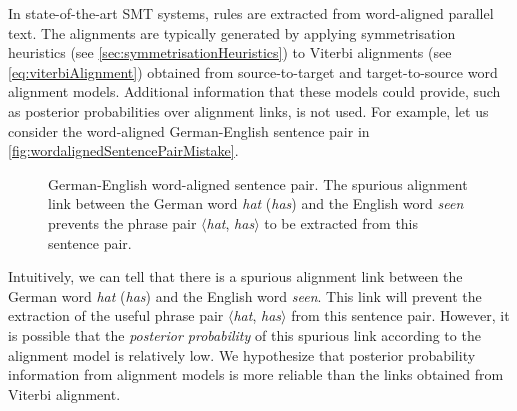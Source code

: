 In state-of-the-art SMT systems, rules are extracted from %
word-aligned parallel text. The alignments are typically generated by
applying symmetrisation
heuristics (see \autoref{sec:symmetrisationHeuristics}) to Viterbi
alignments (see \autoref{eq:viterbiAlignment}) obtained
from source-to-target and target-to-source word alignment models.
Additional information that these models could provide, such as posterior
probabilities over alignment links, is not used. For example, let us consider
the word-aligned German-English sentence pair in
\autoref{fig:wordalignedSentencePairMistake}.
%
\begin{figure}
  \begin{center}
  \end{center}
  \caption{German-English word-aligned sentence pair. The spurious alignment
  link between the German word \emph{hat} (\emph{has}) and the English word \emph{seen}
  prevents the phrase pair $\langle$\emph{hat}, \emph{has}$\rangle$ to be extracted from this
  sentence pair.}
  \label{fig:wordalignedSentencePairMistake}
\end{figure}
%
Intuitively, we can tell that
there is a spurious alignment link between the German
word \emph{hat} (\emph{has}) and the
English word \emph{seen}. This link will prevent the extraction of the useful
phrase pair $\langle$\emph{hat}, \emph{has}$\rangle$
from this sentence pair. However, it is
possible that the \emph{posterior probability} of this spurious link according
to the alignment model is relatively low. We hypothesize that posterior
probability information from alignment models is more reliable than the links
obtained from Viterbi alignment.

